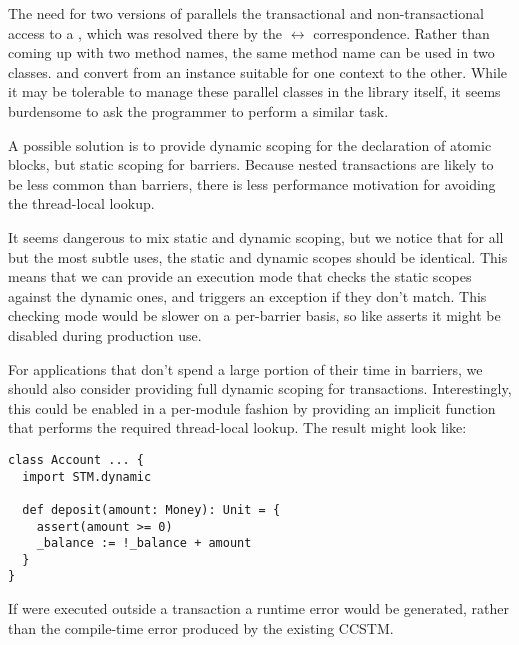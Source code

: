 The need for two versions of  parallels the transactional and
non-transactional access to a , which was resolved there by the
 $\leftrightarrow$  correspondence.  Rather than
coming up with two method names, the same method name can be used in
two classes.   and 
convert from an instance suitable for one context to the other.  While it
may be tolerable to manage these parallel classes in the library itself,
it seems burdensome to ask the programmer to perform a similar task.

A possible solution is to provide dynamic scoping for the declaration
of atomic blocks, but static scoping for barriers.  Because nested
transactions are likely to be less common than barriers, there is less
performance motivation for avoiding the thread-local lookup.

It seems dangerous to mix static and dynamic scoping, but we notice that
for all but the most subtle uses, the static and dynamic scopes should be
identical.  This means that we can provide an execution mode that checks
the
static scopes against the dynamic ones, and triggers an exception 
if they don't match.  This checking mode would be slower on a per-barrier
basis, so like asserts it might be disabled during production use.

For applications that don't spend a large portion of their time in barriers, we
should also consider providing full dynamic scoping for transactions.
Interestingly, this could be enabled in a per-module fashion by providing an
implicit function that performs the required thread-local lookup.  The result
might look like:
\lstset{numbers=none}
\begin{lstlisting}
class Account ... {
  import STM.dynamic

  def deposit(amount: Money): Unit = {
    assert(amount >= 0)
    _balance := !_balance + amount
  }
}
\end{lstlisting}
\lstset{numbers=left}
If  were executed outside a transaction a runtime error would be
generated, rather than the compile-time error produced by the existing CCSTM.

